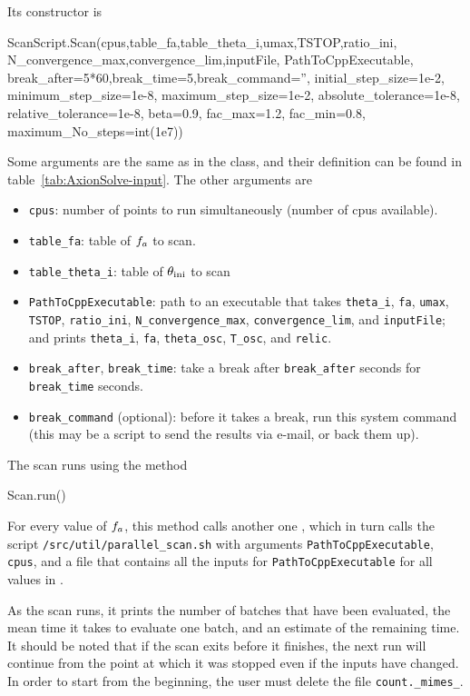\documentclass[11pt,a4paper]{article}
\begin{document}
Its constructor is
%
\begin{py}
	ScanScript.Scan(cpus,table_fa,table_theta_i,umax,TSTOP,ratio_ini,
					N_convergence_max,convergence_lim,inputFile,
					PathToCppExecutable, break_after=5*60,break_time=5,break_command='',
					initial_step_size=1e-2, minimum_step_size=1e-8, maximum_step_size=1e-2, 
					absolute_tolerance=1e-8, relative_tolerance=1e-8,
					beta=0.9, fac_max=1.2, fac_min=0.8, maximum_No_steps=int(1e7))
\end{py}
%
Some arguments are the same as in the  class, and their definition can be found in table~\ref{tab:AxionSolve-input}. The other arguments are
%
\begin{itemize}
        \item {\tt cpus}: number of points to run simultaneously (number of cpus available). 
		\item {\tt table\_fa}: table of $f_{a}{}$ to scan.
		\item {\tt table\_theta\_i}: table of $\theta_{\rm ini}{}$ to scan
        \item {\tt PathToCppExecutable}: path to an executable that takes {\tt theta\_i},  {\tt fa},  {\tt umax},  {\tt TSTOP},  {\tt ratio\_ini}, {\tt N\_convergence\_max}, {\tt convergence\_lim}, and  {\tt inputFile}; and prints {\tt theta\_i}, {\tt fa}, {\tt theta\_osc}, {\tt T\_osc}, and {\tt relic}.
		\item {\tt break\_after}, {\tt break\_time}: take a break after {\tt break\_after} seconds for {\tt break\_time} seconds.
		\item {\tt break\_command} (optional): before it takes a break, run this system command (this may be a script to send the results
		via e-mail, or back them up).
\end{itemize}
%
The scan runs using the method
%
\begin{py}
	Scan.run()
\end{py} 
%
For every value of $f_{a}{}$, this method calls another one , which in turn calls the  script {\tt \mimes/src/util/parallel\_scan.sh} with arguments {\tt PathToCppExecutable}, {\tt cpus}, and a file that contains all the inputs for {\tt PathToCppExecutable} for all values in . 


As the scan runs, it prints the number of batches that have been evaluated, the mean time it takes to evaluate one batch, and an estimate of the remaining time. It should be noted that if the scan exits before it finishes, the next run will continue from the point at which it was stopped even if the inputs have changed. In order to start from the beginning, the user must delete the file {\tt count.\_mimes\_}.
\end{document}

